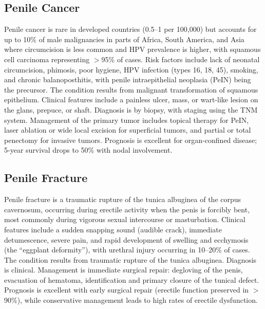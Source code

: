 \subsection{Penile Cancer}
\label{sec:Penile Cancer}
Penile cancer is rare in developed countries (0.5--1 per 100,000) but accounts for up to 10\% of male malignancies in parts of Africa, South America, and Asia where circumcision is less common and HPV prevalence is higher, with squamous cell carcinoma representing $>$95\% of cases. Risk factors include lack of neonatal circumcision, phimosis, poor hygiene, HPV infection (types 16, 18, 45), smoking, and chronic balanoposthitis, with penile intraepithelial neoplasia (PeIN) being the precursor. The condition results from malignant transformation of squamous epithelium. Clinical features include a painless ulcer, mass, or wart-like lesion on the glans, prepuce, or shaft. Diagnosis is by biopsy, with staging using the TNM system. Management of the primary tumor includes topical therapy for PeIN, laser ablation or wide local excision for superficial tumors, and partial or total penectomy for invasive tumors. Prognosis is excellent for organ-confined disease; 5-year survival drops to 50\% with nodal involvement.

\subsection{Penile Fracture}
\label{sec:Penile Fracture}
Penile fracture is a traumatic rupture of the tunica albuginea of the corpus cavernosum, occurring during erectile activity when the penis is forcibly bent, most commonly during vigorous sexual intercourse or masturbation. Clinical features include a sudden snapping sound (audible crack), immediate detumescence, severe pain, and rapid development of swelling and ecchymosis (the ``eggplant deformity''), with urethral injury occurring in 10--20\% of cases. The condition results from traumatic rupture of the tunica albuginea. Diagnosis is clinical. Management is immediate surgical repair: degloving of the penis, evacuation of hematoma, identification and primary closure of the tunical defect. Prognosis is excellent with early surgical repair (erectile function preserved in $>$90\%), while conservative management leads to high rates of erectile dysfunction.

